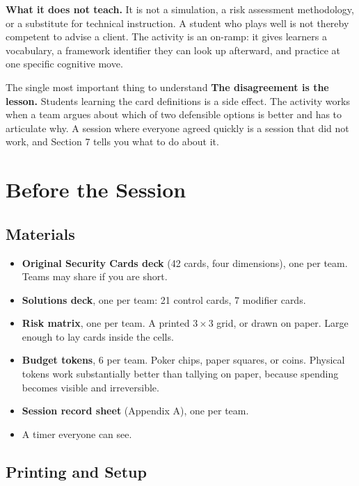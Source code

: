 \documentclass[11pt,letterpaper]{article}
\begin{document}
\textbf{What it does not teach.} It is not a simulation, a risk assessment
methodology, or a substitute for technical instruction. A student who plays well
is not thereby competent to advise a client. The activity is an on-ramp: it
gives learners a vocabulary, a framework identifier they can look up afterward,
and practice at one specific cognitive move.

\begin{note}{The single most important thing to understand}
\textbf{The disagreement is the lesson.} Students learning the card definitions
is a side effect. The activity works when a team argues about which of two
defensible options is better and has to articulate why. A session where everyone
agreed quickly is a session that did not work, and Section 7 tells you what to
do about it.
\end{note}

\section{Before the Session}

\subsection{Materials}

\begin{itemize}
\item \textbf{Original Security Cards deck} (42 cards, four dimensions), one per
team. Teams may share if you are short.
\item \textbf{Solutions deck}, one per team: 21 control cards, 7 modifier cards.
\item \textbf{Risk matrix}, one per team. A printed $3\times3$ grid, or drawn on
paper. Large enough to lay cards inside the cells.
\item \textbf{Budget tokens}, 6 per team. Poker chips, paper squares, or coins.
Physical tokens work substantially better than tallying on paper, because
spending becomes visible and irreversible.
\item \textbf{Session record sheet} (Appendix A), one per team.
\item A timer everyone can see.
\end{itemize}

\subsection{Printing and Setup}
\end{document}

